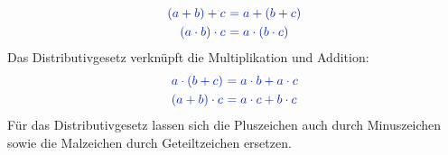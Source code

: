 \begin{align*}
	\textcolor{loes}{\left( a+b\right) +c\ }&\textcolor{loes}{=a+\left( b+c\right) }\\
	\textcolor{loes}{\left( a\cdot b\right) \cdot c\ }&\textcolor{loes}{=a\cdot\left( b\cdot c\right) }
\end{align*}
Das Distributivgesetz verknüpft die Multiplikation und Addition:
\begin{align*}
	\textcolor{loes}{a\cdot\left( b+c\right)\ }&\textcolor{loes}{=a\cdot b+a\cdot c}\\
	\textcolor{loes}{\left( a+b\right) \cdot c\ }&\textcolor{loes}{=a\cdot c+b\cdot c }
\end{align*}
Für das Distributivgesetz lassen sich die Pluszeichen auch durch Minuszeichen sowie die Malzeichen durch Geteiltzeichen ersetzen.
\newpage

